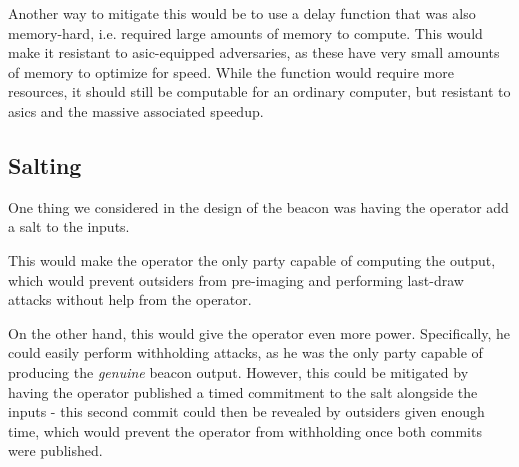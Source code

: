 Another way to mitigate this would be to use a delay function that was also memory-hard, i.e. required large amounts of memory to compute. This would make it resistant to \acrshort{asic}-equipped adversaries, as these have very small amounts of memory to optimize for speed. While the function would require more resources, it should still be computable for an ordinary computer, but resistant to \acrshort{asic}s and the massive associated speedup.

\subsection{Salting}

One thing we considered in the design of the beacon was having the operator add a salt to the inputs.

This would make the operator the only party capable of computing the output, which would prevent outsiders from pre-imaging and performing last-draw attacks without help from the operator.

On the other hand, this would give the operator even more power. Specifically, he could easily perform withholding attacks, as he was the only party capable of producing the \textit{genuine} beacon output. However, this could be mitigated by having the operator published a timed commitment to the salt alongside the inputs - this second commit could then be revealed by outsiders given enough time, which would prevent the operator from withholding once both commits were published.